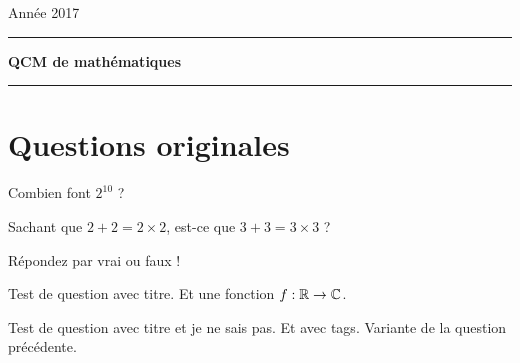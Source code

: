 \documentclass[12pt,a4paper]{article}
\begin{document}
 
 


\hfill\textsf{Ann\'ee 2017}

\vspace*{0.5ex}
\hrule\vspace*{1.5ex} 
\hfil\textsf{\textbf{\Large QCM de mathématiques}}
\vspace*{1ex} \hrule 
\vspace*{5ex} 


\section{Questions originales}


\begin{question}

Combien font $2^{10}$ ? %

\begin{answers}  
\end{answers}
\end{question}



\begin{question}
Sachant que $2+2=2\times 2$, 
est-ce que $3+3 = 3\times 3$ ?

Répondez par vrai ou faux !
\begin{answers}

   

\end{answers}
\end{question}



\begin{question}

Test de question avec titre. Et une fonction $f : \mathbb{R} \to \mathbb{C}$. 
\begin{answers}


\end{answers}
\end{question}



\begin{question} 
\qkeeporder
\qidontknow

Test de question avec titre et je ne sais pas. Et avec tags. Variante de la question précédente.

\begin{answers}
\end{answers}
\end{question}
\end{document}
